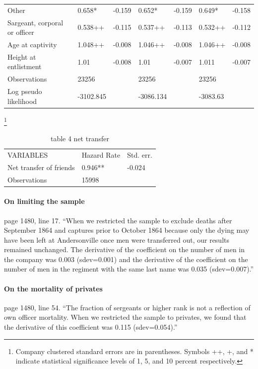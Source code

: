 \documentclass[a4paper]{report}\usepackage{graphicx, color}
\begin{document}
\begin{refsection}
\begin{table}
\begin{tabular}{lllllll}
Other                                    & 0.658*      & -0.159    & 0.652*      & -0.159    & 0.649*      & -0.158    \\
Sargeant, corporal or officer            & 0.538++     & -0.115    & 0.537++     & -0.113    & 0.532++     & -0.112    \\
Age at captivity                         & 1.048++     & -0.008    & 1.046++     & -0.008    & 1.046++     & -0.008    \\
Height at entlistment                    & 1.01        & -0.008    & 1.01        & -0.007    & 1.011       & -0.007    \\
Observations                             & 23256       &           & 23256       &           & 23256       &           \\
Log pseudo likelihood                    & -3102.845   &           & -3086.134   &           & -3083.63    &           \\
\end{tabular}
\end{table}

\begin{table}[ht]
\centering
\caption{table 4 net transfer}\footnote{Company clustered standard errors are in parentheses. Symbols ++, +, and * indicate statistical significance levels of 1, 5, and 10 percent respectively.}
\begin{tabular}{lll}
\hline
VARIABLES               & Hazard Rate & Std. err. \\
Net transfer of friends & 0.946**     & -0.024    \\
Observations            & 15998       &           \\
\end{tabular}
\end{table}

\paragraph{On limiting the sample}
page 1480, line 17. ``When we restricted the sample to exclude deaths after September 1864 and captures prior to October 1864 because only the dying may have been left at Andersonville once men were transferred out, our results remained unchanged. The derivative of the coefficient on the number of men in the company was 0.003 (sdev=0.001) and the derivative of the coefficient on the number of men in the regiment with the same last name was 0.035 (sdev=0.007).''

\paragraph{On the mortality of privates}
page 1480, line 54. ``The fraction of sergeants or higher rank is not a reflection of own officer mortality. When we restricted the sample to privates, we found that the derivative of this coefficient was 0.115 (sdev=0.054).''


\end{refsection}
\end{document}
